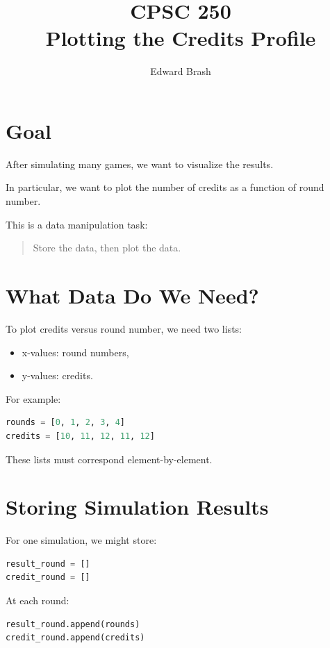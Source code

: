 \documentclass[11pt]{article}
\title{CPSC 250 \\ Plotting the Credits Profile}
\author{Edward Brash}
\date{}
\begin{document}
\maketitle

\section{Goal}

After simulating many games, we want to visualize the results.

In particular, we want to plot the number of credits as a function of round number.

This is a data manipulation task:

\begin{quote}
Store the data, then plot the data.
\end{quote}

\section{What Data Do We Need?}

To plot credits versus round number, we need two lists:

\begin{itemize}
    \item x-values: round numbers,
    \item y-values: credits.
\end{itemize}

For example:

\begin{lstlisting}[language=Python]
rounds = [0, 1, 2, 3, 4]
credits = [10, 11, 12, 11, 12]
\end{lstlisting}

These lists must correspond element-by-element.

\section{Storing Simulation Results}

For one simulation, we might store:

\begin{lstlisting}[language=Python]
result_round = []
credit_round = []
\end{lstlisting}

At each round:

\begin{lstlisting}[language=Python]
result_round.append(rounds)
credit_round.append(credits)
\end{lstlisting}
\end{document}
